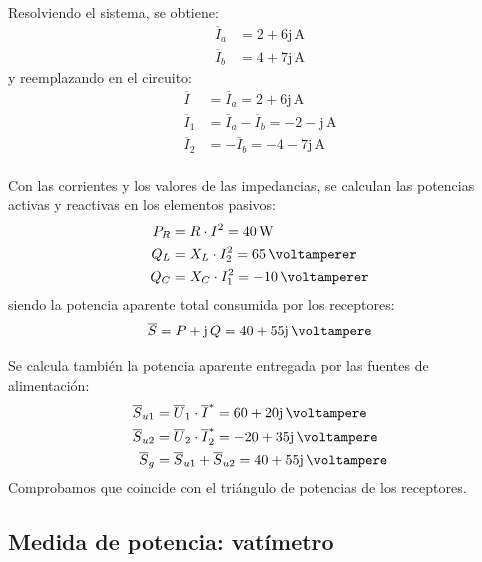 \begin{example}
  \vspace{3mm} Resolviendo el sistema, se obtiene:
  \begin{align*}
    \overline{I}_a&= 2 + 6\mathrm{j}\,\unit{\ampere}\\
    \overline{I}_b&= 4 + 7\mathrm{j}\,\unit{\ampere}
  \end{align*}          
  y reemplazando en el circuito:
  \begin{align*}
    \overline{I}&=\overline{I}_a= 2 + 6\mathrm{j}\,\unit{\ampere}\\
    \overline{I}_1&=\overline{I}_a - \overline{I}_b= -2 -\mathrm{j}\,\unit{\ampere}\\
    \overline{I}_2&=-\overline{I}_b= -4 - 7\mathrm{j}\,\unit{\ampere}\\
  \end{align*}	

  \vspace{-3mm} Con las corrientes y los valores de las impedancias,
  se calculan las potencias activas y reactivas en los elementos
  pasivos:
  \begin{align*}
    P_R&=R\cdot I^2=\qty{40}{\watt}\\
    Q_L &= X_L\cdot I_2^2=\qty{65}{\voltamperer}\\
    Q_C&=X_C\cdot I_1^2=-\qty{10}{\voltamperer}
  \end{align*}
  siendo la potencia aparente total consumida por los receptores:
  \begin{equation*}
    \overline{S}=P+\mathrm{j}\,Q= 40 + 55\mathrm{j}\,\unit{\voltampere}
  \end{equation*}
		
  Se calcula también la potencia aparente entregada por las fuentes de
  alimentación:
  \begin{align*}
    \overline{S}_{u1}&=\overline{U}_1\cdot \overline{I}^*= 60 + 20\mathrm{j}\,\unit{\voltampere}\\
    \overline{S}_{u2}&=\overline{U}_2\cdot \overline{I}_2^*= -20 + 35\mathrm{j}\,\unit{\voltampere}\\
    \overline{S}_g &= \overline{S}_{u1} + \overline{S}_{u2} = 40 + 55\mathrm{j}\,\unit{\voltampere}
  \end{align*}
  Comprobamos que coincide con el triángulo de potencias de los
  receptores.
                        
\end{example}
	
\subsection{Medida de potencia: vatímetro}\label{sec:medida_potencia}
	
